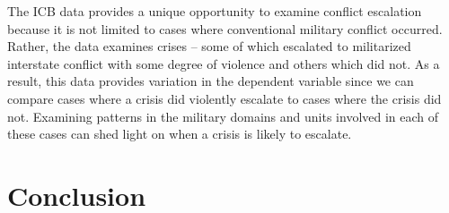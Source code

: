 \documentclass[12pt,letterpaper]{article}
\begin{document}
	The ICB data provides a unique opportunity to examine conflict escalation because it is not limited to cases where conventional military conflict occurred. Rather, the data examines crises -- some of which escalated to militarized interstate conflict with some degree of violence and others which did not. As a result, this data provides variation in the dependent variable since we can compare cases where a crisis did violently escalate to cases where the crisis did not. Examining patterns in the military domains and units involved in each of these cases can shed light on when a crisis is likely to escalate.

\section{Conclusion}


\singlespacing


	
\end{document}

